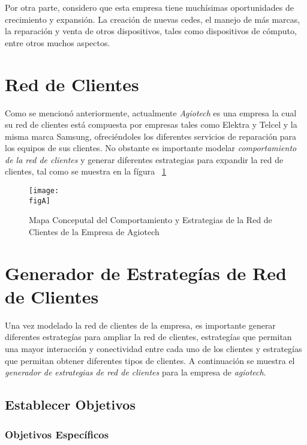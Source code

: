 Por otra parte, considero que esta empresa tiene muchísimas oportunidades de crecimiento
y expansión. La creación de nuevas cedes, el manejo de más marcas, la reparación
y venta de otros dispositivos, tales como dispositivos de cómputo, entre otros
muchos aspectos.


\clearpage

\section{Red de Clientes}

Como se mencionó anteriormente, actualmente \textit{Agiotech} es una empresa la cual
su red de clientes está compuesta por empresas tales como Elektra y Telcel y la misma
marca Samsung, ofreciéndoles los diferentes servicios de reparación para los
equipos de sus clientes. No obstante es importante modelar \textit{comportamiento
	de la red de clientes} y generar diferentes estrategias para expandir la red de
clientes, tal como se muestra en la fígura ~\ref{fig:Red de Clientes}

\begin{figure}[ht]
	\centering
	\texttt{[image: \\figA]}
	\caption{Mapa Conceputal del Comportamiento y Estrategias de la Red de
		Clientes de la Empresa de Agiotech}
	\label{fig:Red de Clientes}
\end{figure}


\clearpage
\section{Generador de Estrategías de Red de Clientes}

Una vez modelado la red de clientes de la empresa, es importante generar diferentes
estrategías para ampliar la red de clientes, estrategías que permitan una mayor
interacción y conectividad entre cada uno de los clientes y estrategías que
permitan obtener diferentes tipos de clientes. A continuación se muestra el \textit{generador
	de estrategias de red de clientes} para la empresa de \textit{agiotech}.

\subsection{Establecer Objetivos}

\subsubsection{Objetivos Específicos}

